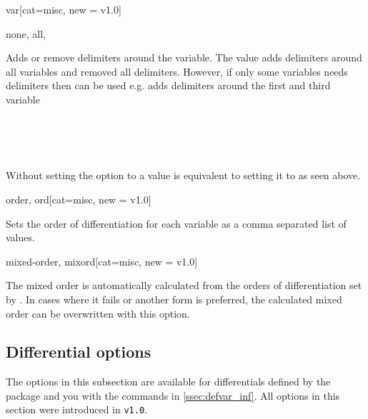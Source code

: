 	\begin{option}{var}[cat=misc, new = v1.0]
		\begin{values}[default=none]
			none, all, 
		\end{values}
		Adds or remove delimiters around the variable. The value  adds delimiters around all variables and  removed all delimiters. However, if only some variables needs delimiters then  can be used e.g.  adds delimiters around the first and third variable
		\begin{example}
			 \\
			 \\
			 \\
		\end{example}
		Without setting the option to a value is equivalent to setting it to  as seen above.
	\end{option}
	
	\begin{option}{order, ord}[cat=misc, new = v1.0]
		\begin{values}[default = 1]
		\end{values}
		Sets the order of differentiation for each variable as a comma separated list of values.
	\end{option}
	
	\bigskip\bigskip
	
	\begin{option}{mixed-order, mixord}[cat=misc, new = v1.0]
		\begin{values}[default = 1]
		\end{values}
		The mixed order is automatically calculated from the orders of differentiation set by . 
		In cases where it fails or another form is preferred, the calculated mixed order can be overwritten with this option.
	\end{option}
	
	\subsection{Differential options} \label{ssec:options_inf}
	The options in this subsection are available for differentials defined by the package and you with the commands in \cref{ssec:defvar_inf}. All options in this section were introduced in \texttt{v1.0}.
	

